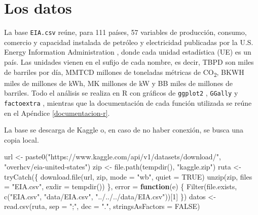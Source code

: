 \documentclass[oneside, openany, fontset=libertinus]{mitthesis}
\newenvironment{Shaded}{\begin{snugshade}}{\end{snugshade}}
\newcommand{\AttributeTok}[1]{\textcolor[rgb]{0.40,0.45,0.13}{#1}}
\newcommand{\ConstantTok}[1]{\textcolor[rgb]{0.56,0.35,0.01}{#1}}
\newcommand{\ControlFlowTok}[1]{\textcolor[rgb]{0.00,0.23,0.31}{\textbf{#1}}}
\newcommand{\DecValTok}[1]{\textcolor[rgb]{0.68,0.00,0.00}{#1}}
\newcommand{\FunctionTok}[1]{\textcolor[rgb]{0.28,0.35,0.67}{#1}}
\newcommand{\NormalTok}[1]{\textcolor[rgb]{0.00,0.23,0.31}{#1}}
\newcommand{\OtherTok}[1]{\textcolor[rgb]{0.00,0.23,0.31}{#1}}
\newcommand{\StringTok}[1]{\textcolor[rgb]{0.13,0.47,0.30}{#1}}
\begin{document}


\chapter{Los datos}\label{datos}

La base \texttt{EIA.csv} reúne, para 111 países, 57 variables de
producción, consumo, comercio y capacidad instalada de petróleo y
electricidad publicadas por la U.S. Energy Information Administration
\parencite{eia-datos}, donde cada unidad estadística (UE) es un país.
Las unidades vienen en el sufijo de cada nombre, es decir, TBPD son
miles de barriles por día, MMTCD millones de toneladas métricas de
CO\textsubscript{2}, BKWH miles de millones de kWh, MK millones de kW y
BB miles de millones de barriles. Todo el análisis se realiza en R
\parencite{r-core} con gráficos de \texttt{ggplot2} \parencite{ggplot2},
\texttt{GGally} \parencite{ggally} y \texttt{factoextra}
\parencite{factoextra}, mientras que la documentación de cada función
utilizada se reúne en el Apéndice \ref{documentacion-r}.

La base se descarga de Kaggle o, en caso de no haber conexión, se busca
una copia local.

\Needspace{2.28in}

\begin{Shaded}
\begin{Highlighting}[]
\NormalTok{url }\OtherTok{\textless{}{-}} \FunctionTok{paste0}\NormalTok{(}\StringTok{"https://www.kaggle.com/api/v1/datasets/download/"}\NormalTok{,}
              \StringTok{"overhcv/eia{-}united{-}states"}\NormalTok{)}
\NormalTok{zip }\OtherTok{\textless{}{-}} \FunctionTok{file.path}\NormalTok{(}\FunctionTok{tempdir}\NormalTok{(), }\StringTok{"kaggle.zip"}\NormalTok{)}
\NormalTok{ruta }\OtherTok{\textless{}{-}} \FunctionTok{tryCatch}\NormalTok{(\{}
  \FunctionTok{download.file}\NormalTok{(url, zip, }\AttributeTok{mode =} \StringTok{"wb"}\NormalTok{, }\AttributeTok{quiet =} \ConstantTok{TRUE}\NormalTok{)}
  \FunctionTok{unzip}\NormalTok{(zip, }\AttributeTok{files =} \StringTok{"EIA.csv"}\NormalTok{, }\AttributeTok{exdir =} \FunctionTok{tempdir}\NormalTok{())}
\NormalTok{\}, }\AttributeTok{error =} \ControlFlowTok{function}\NormalTok{(e) \{}
  \FunctionTok{Filter}\NormalTok{(file.exists, }\FunctionTok{c}\NormalTok{(}\StringTok{"EIA.csv"}\NormalTok{, }\StringTok{"data/EIA.csv"}\NormalTok{,}
                        \StringTok{"../../../data/EIA.csv"}\NormalTok{))[}\DecValTok{1}\NormalTok{]}
\NormalTok{\})}
\NormalTok{datos }\OtherTok{\textless{}{-}} \FunctionTok{read.csv}\NormalTok{(ruta, }\AttributeTok{sep =} \StringTok{";"}\NormalTok{, }\AttributeTok{dec =} \StringTok{"."}\NormalTok{,}
                  \AttributeTok{stringsAsFactors =} \ConstantTok{FALSE}\NormalTok{)}
\end{Highlighting}
\end{Shaded}
\end{document}
